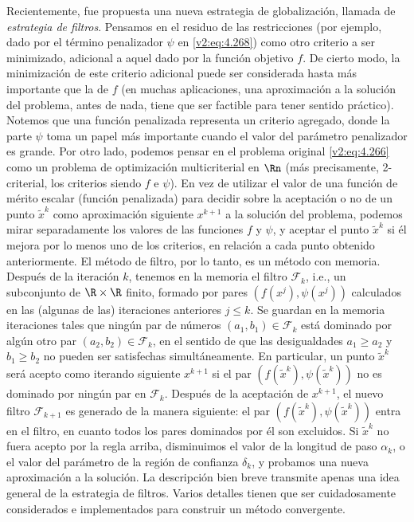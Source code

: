 Recientemente, fue propuesta una nueva estrategia de globalización, llamada de \textit{estrategia de filtros}. Pensamos en el residuo de las restricciones (por ejemplo, dado por el término penalizador $\psi$ en \eqref{v2:eq:4.268}) como otro criterio a ser minimizado, adicional a aquel dado por la función objetivo $f$. De cierto modo, la minimización de este criterio adicional puede ser considerada hasta más importante que la de $f$ (en muchas aplicaciones, una aproximación a la solución del problema, antes de nada, tiene que ser factible para tener sentido práctico). Notemos que una función penalizada representa un criterio agregado, donde la parte $\psi$ toma un papel más importante cuando el valor del parámetro penalizador es grande. Por otro lado, podemos pensar en el problema original \eqref{v2:eq:4.266} como un problema de optimización multicriterial en $\Rn$ (más precisamente, 2-criterial, los criterios siendo $f$ e $\psi$). En vez de utilizar el valor de una función de mérito escalar (función penalizada) para decidir sobre la aceptación o no de un punto $\tilde{x}^k$ como aproximación siguiente $x^{k+1}$ a la solución del problema, podemos mirar separadamente los valores de las funciones $f$ y $\psi$, y aceptar el punto $\tilde{x}^k$ si él mejora por lo menos uno de los criterios, en relación a cada punto obtenido anteriormente. El método de filtro, por lo tanto, es un método con memoria. Después de la iteración $k$, tenemos en la memoria el filtro $\mathcal{F}_k$, i.e., un subconjunto de $\R \times \R$ finito, formado por pares $(f(x^j), \psi(x^j))$ calculados en las (algunas de las) iteraciones anteriores $j \le k$. Se guardan en la memoria iteraciones tales que ningún par de números $(a_1, b_1) \in \mathcal{F}_k$ está dominado por algún otro par $(a_2, b_2) \in \mathcal{F}_k$, en el sentido de que las desigualdades $a_1 \ge a_2$ y $b_1 \ge b_2$ no pueden ser satisfechas simultáneamente. En particular, un punto $\tilde{x}^k$ será acepto como iterando siguiente $x^{k+1}$ si el par $(f(\tilde{x}^k), \psi(\tilde{x}^k))$ no es dominado por ningún par en $\mathcal{F}_k$. Después de la aceptación de $x^{k+1}$, el nuevo filtro $\mathcal{F}_{k+1}$ es generado de la manera siguiente: el par $(f(\tilde{x}^k), \psi(\tilde{x}^k))$ entra en el filtro, en cuanto todos los pares dominados por él son excluidos. Si $\tilde{x}^k$ no fuera acepto por la regla arriba, disminuimos el valor de la longitud de paso $\alpha_k$, o el valor del parámetro de la región de confianza $\delta_k$, y probamos una nueva aproximación a la solución. La descripción bien breve transmite apenas una idea general de la estrategia de filtros. Varios detalles tienen que ser cuidadosamente considerados e implementados para construir un método convergente.
